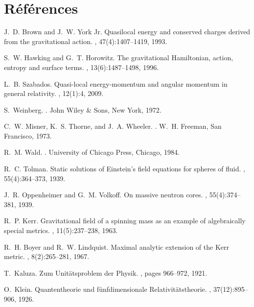 \documentclass[11pt]{article}
\begin{document}
\section*{R\'ef\'erences}

\begin{thebibliography}{10}

J.~D. Brown and J.~W. York Jr.
\newblock Quasilocal energy and conserved charges derived from the gravitational action.
, 47(4):1407--1419, 1993.

S.~W. Hawking and G.~T. Horowitz.
\newblock The gravitational Hamiltonian, action, entropy and surface terms.
, 13(6):1487--1498, 1996.

L.~B. Szabados.
\newblock Quasi-local energy-momentum and angular momentum in general relativity.
, 12(1):4, 2009.

S.~Weinberg.
.
\newblock John Wiley \& Sons, New York, 1972.

C.~W. Misner, K.~S. Thorne, and J.~A. Wheeler.
.
\newblock W.~H. Freeman, San Francisco, 1973.

R.~M. Wald.
.
\newblock University of Chicago Press, Chicago, 1984.

R.~C. Tolman.
\newblock Static solutions of Einstein's field equations for spheres of fluid.
, 55(4):364--373, 1939.

J.~R. Oppenheimer and G.~M. Volkoff.
\newblock On massive neutron cores.
, 55(4):374--381, 1939.

R.~P. Kerr.
\newblock Gravitational field of a spinning mass as an example of algebraically special metrics.
, 11(5):237--238, 1963.

R.~H. Boyer and R.~W. Lindquist.
\newblock Maximal analytic extension of the Kerr metric.
, 8(2):265--281, 1967.

T.~Kaluza.
\newblock Zum Unitätsproblem der Physik.
, pages 966--972, 1921.

O.~Klein.
\newblock Quantentheorie und fünfdimensionale Relativitätstheorie.
, 37(12):895--906, 1926.

\end{thebibliography}
\end{document}
